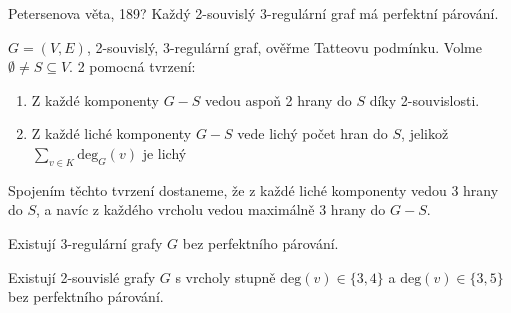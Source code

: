 \begin{t_theorem}{Petersenova věta, 189?}
  Každý 2-souvislý 3-regulární graf má perfektní párování.
\end{t_theorem}

\begin{t_proof}
  $G=(V,E)$, 2-souvislý, 3-regulární graf, ověřme Tatteovu podmínku. Volme $\emptyset \neq S \subseteq V$. 2 pomocná tvrzení:
  \begin{enumerate}
    \item Z každé komponenty $G-S$ vedou aspoň 2 hrany do $S$ díky 2-souvislosti.
    \item Z každé liché komponenty $G-S$ vede lichý počet hran do $S$, jelikož $\sum_{v \in K} \mathrm{deg}_G (v)$ je lichý
  \end{enumerate}
  Spojením těchto tvrzení dostaneme, že z každé liché komponenty vedou 3 hrany do $S$, a navíc z každého vrcholu vedou maximálně 3 hrany do $G-S$.
\end{t_proof}

\begin{t_remark}
  Existují 3-regulární grafy $G$ bez perfektního párování.
\end{t_remark}
\begin{t_remark}
  Existují 2-souvislé grafy $G$ s vrcholy stupně $\mathrm{deg}(v) \in \{3,4\}$ a $\mathrm{deg}(v) \in \{3,5\}$ bez perfektního párování.
\end{t_remark}




